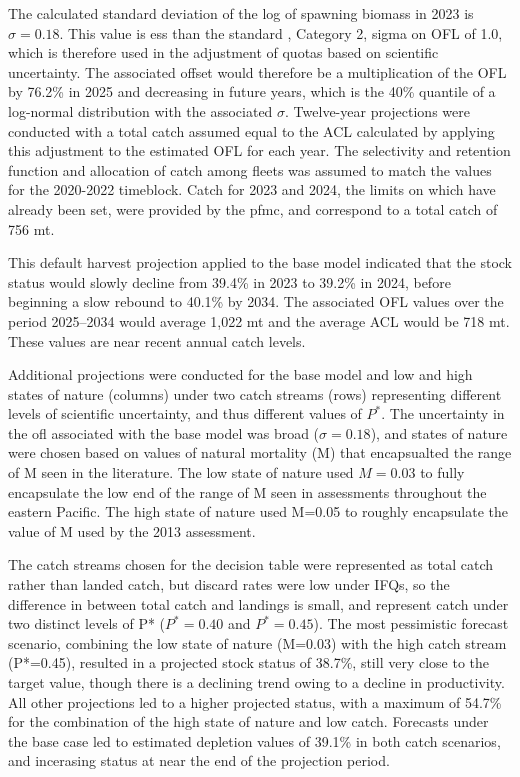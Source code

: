 \documentclass[11pt,
  letterpaper,
]{article}
\begin{document}
The calculated standard deviation of the log of spawning biomass in 2023 is \(\sigma = 0.18\). This value is ess than the standard , Category 2, sigma on OFL of 1.0, which is therefore used in the adjustment of quotas based on scientific uncertainty. The associated offset would therefore be a multiplication of the OFL by 76.2\% in 2025 and decreasing in future years, which is the 40\% quantile of a log-normal distribution with the associated \(\sigma\). Twelve-year projections were conducted with a total catch assumed equal to the ACL calculated by applying this adjustment to the estimated OFL for each year. The selectivity and retention function and allocation of catch among fleets was assumed to match the values for the 2020-2022 timeblock. Catch for 2023 and 2024, the limits on which have already been set, were provided by the \gls{pfmc}, and correspond to a total catch of 756 mt.

This default harvest projection applied to the base model indicated that the stock status would slowly decline from 39.4\% in 2023 to 39.2\% in 2024, before beginning a slow rebound to 40.1\% by 2034. The associated OFL values over the period 2025--2034 would average 1,022 mt and the average ACL would be 718 mt. These values are near recent annual catch levels.

Additional projections were conducted for the base model and low and high states of nature (columns) under two catch streams (rows) representing different levels of scientific uncertainty, and thus different values of \(P^*\). The uncertainty in the \gls{ofl} associated with the base model was broad (\(\sigma = 0.18\)), and states of nature were chosen based on values of natural mortality (M) that encapsualted the range of M seen in the literature. The low state of nature used \(M=0.03\) to fully encapsulate the low end of the range of M seen in assessments throughout the eastern Pacific. The high state of nature used M=0.05 to roughly encapsulate the value of M used by the 2013 assessment.

The catch streams chosen for the decision table were represented as total catch rather than landed catch, but discard rates were low under IFQs, so the difference in between total catch and landings is small, and represent catch under two distinct levels of P* (\(P^*=0.40\) and \(P^*=0.45\)). The most pessimistic forecast scenario, combining the low state of nature (M=0.03) with the high catch stream (P*=0.45), resulted in a projected stock status of 38.7\%, still very close to the target value, though there is a declining trend owing to a decline in productivity. All other projections led to a higher projected status, with a maximum of 54.7\% for the combination of the high state of nature and low catch. Forecasts under the base case led to estimated depletion values of 39.1\% in both catch scenarios, and incerasing status at near the end of the projection period.
\end{document}
